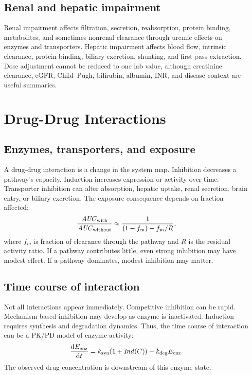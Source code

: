 \documentclass[a4paper]{article}
\newcommand{\pkAUC}{\pksym{AUC}}
\begin{document}
\subsection{Renal and hepatic impairment}

Renal impairment affects filtration, secretion, reabsorption, protein binding, metabolites, and sometimes nonrenal clearance through uremic effects on enzymes and transporters. Hepatic impairment affects blood flow, intrinsic clearance, protein binding, biliary excretion, shunting, and first-pass extraction. Dose adjustment cannot be reduced to one lab value, although creatinine clearance, eGFR, Child--Pugh, bilirubin, albumin, INR, and disease context are useful summaries.

\section{Drug-Drug Interactions}

\subsection{Enzymes, transporters, and exposure}

A drug-drug interaction is a change in the system map. Inhibition decreases a pathway's capacity. Induction increases expression or activity over time. Transporter inhibition can alter absorption, hepatic uptake, renal secretion, brain entry, or biliary excretion. The exposure consequence depends on fraction affected:
\[
  \frac{\pkAUC_{\pklab{with}}}{\pkAUC_{\pklab{without}}}
  \approx
  \frac{1}{(1-f_m)+f_m/R},
\]
where \(f_m\) is fraction of clearance through the pathway and \(R\) is the residual activity ratio. If a pathway contributes little, even strong inhibition may have modest effect. If a pathway dominates, modest inhibition may matter.

\subsection{Time course of interaction}

Not all interactions appear immediately. Competitive inhibition can be rapid. Mechanism-based inhibition may develop as enzyme is inactivated. Induction requires synthesis and degradation dynamics. Thus, the time course of interaction can be a PK/PD model of enzyme activity:
\[
  \frac{\dd E_{\pklab{enz}}}{\dd t}
  =
  k_{\pklab{syn}}(1+\pksym{Ind}(C))
  -
  k_{\pklab{deg}}E_{\pklab{enz}}.
\]
The observed drug concentration is downstream of this enzyme state.
\end{document}
